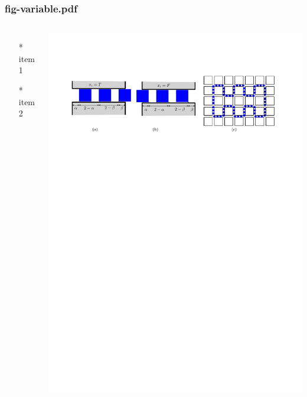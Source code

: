 \begin{frame} \frametitle{fig-variable.pdf}
    \begin{columns}[c]
        \begin{itemize}
            \item[*] item 1
            \item[*] item 2
        \end{itemize}
        \begin{minipage}{\linewidth}
            \begin{center}
            \includegraphics[width=.9\textwidth]{graphics/fig-variable.pdf}
            \label{gfx:fig-variable.pdf}
            \end{center}
        \end{minipage}
    \end{columns}
\end{frame}
